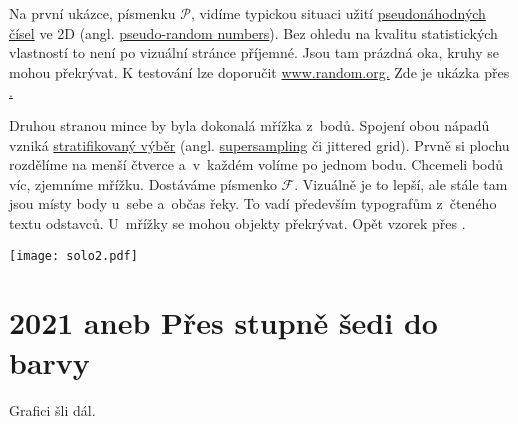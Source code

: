 Na první ukázce, písmenku $\mathcal{P}$, vidíme typickou situaci užití 
\href{https://www.random.org/randomness/}{pseudonáhodných čísel} ve 2D (angl. 
\href{https://en.wikipedia.org/wiki/Pseudorandom_number_generator}{pseudo-random numbers}). Bez ohledu na kvalitu statistických vlastností to není po vizuální stránce příjemné. Jsou tam prázdná oka, kruhy se mohou překrývat. K testování lze doporučit 
\href{https://www.random.org/}{\url{www.random.org.}} Zde je ukázka přes \href{https://www.ctan.org/pkg/pgf}{\maltikz.}



\noindent
{}


Druhou stranou mince by byla dokonalá mřížka z~bodů. Spojení obou nápadů vzniká 
\href{https://cs.wikipedia.org/wiki/Pravd%C4%9Bpodobnostn%C3%AD_v%C3%BDb%C4%9Br}{stratifikovaný výběr} 
(angl. 
\href{https://cs.wikipedia.org/wiki/Supersampling}{supersampling} či jittered grid). Prvně si plochu rozdělíme na menší čtverce a~v~každém volíme po jednom bodu. Chceme\z li bodů víc, zjemníme mřížku. Dostáváme písmenko $\mathcal{F}$. Vizuálně je to lepší, ale stále tam jsou místy body u~sebe a~občas řeky. To vadí především typografům z~čteného textu odstavců. U~mřížky se mohou objekty překrývat. Opět vzorek přes \maltikz.




\noindent
\texttt{[image: solo2.pdf]}



\section{2021 aneb Přes stupně šedi do barvy}

Grafici šli dál. 

